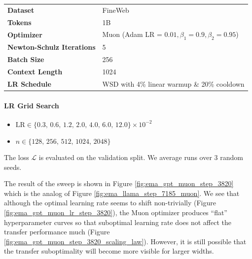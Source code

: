 \documentclass{article} %
\begin{document}
\begin{table}[ht]
\centering
\small
\renewcommand{\arraystretch}{1.2}
\begin{tabular}{@{}ll@{}}
\toprule
\textbf{Dataset}       & FineWeb                                        \\ 
\addlinespace
\textbf{Tokens}        & 1B                                                   \\ 
\addlinespace
\textbf{Optimizer}     & Muon (Adam LR = $0.01, \beta_1=0.9, \beta_2=0.95$) \\
\addlinespace
\textbf{Newton-Schulz Iterations} & 5 \\
\addlinespace
\textbf{Batch Size}     & 256 \\
\addlinespace
\textbf{Context Length}     & 1024 \\

\addlinespace
\textbf{LR Schedule}   & WSD with 4\% linear warmup \& 20\% cooldown         \\ 
\bottomrule
\end{tabular}
\end{table}



\paragraph{LR Grid Search}
\begin{itemize}[nosep,leftmargin=*]
  \item \(\displaystyle \mathrm{LR} \in \{0.3,\, 0.6,\, 1.2,\, 2.0,\, 4.0,\, 6.0,\,12.0
\}\times10^{-2}\)
  
  \vspace{2mm}
  
  \item \(n \in \{128,\,256,\,512,\,1024,\,2048\}\)
\end{itemize}
The loss \(\mathcal{L}\) is evaluated on the validation split. We average runs over 3 random seeds.

The result of the sweep is shown in Figure \ref{fig:ema_gpt_muon_step_3820} which is the analog of Figure \ref{fig:ema_llama_step_7185_muon}. We see that although the optimal learning rate seems to shift non-trivially (Figure \ref{fig:ema_gpt_muon_lr_step_3820}), the Muon optimizer produces ``flat'' hyperparameter curves so that suboptimal learning rate does not affect the transfer performance much (Figure \ref{fig:ema_gpt_muon_step_3820_scaling_law}). However, it is still possible that the transfer suboptimality will become more visible for larger widths.
\end{document}
